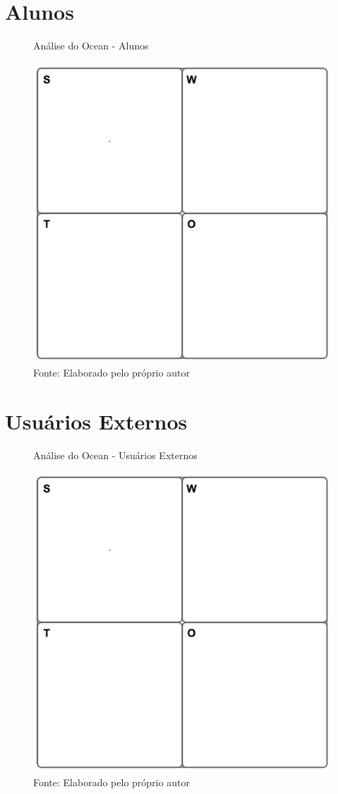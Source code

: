 \section{Alunos}

\begin{figure}[H]
\caption{Análise do Ocean - Alunos}
\centerline{\includegraphics[scale=0.75]{img/generalswot}}
\label{fig:swotalunos}
\caption* {Fonte: Elaborado pelo próprio autor}
\end{figure}

\section{Usuários Externos}

\begin{figure}[h]
\caption{Análise do Ocean - Usuários Externos}
\centerline{\includegraphics[scale=0.75]{img/generalswot}}
\label{fig:swotusuarios}
\caption* {Fonte: Elaborado pelo próprio autor}
\end{figure}